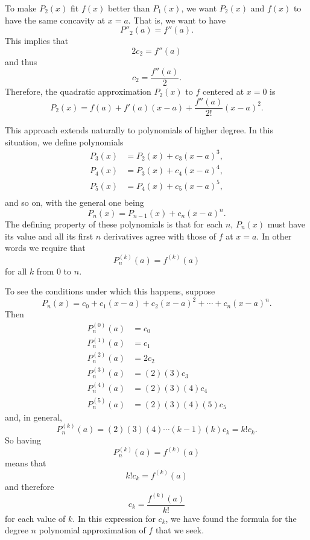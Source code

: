 To make $P_2(x)$ fit $f(x)$ better than $P_1(x)$, we want $P_2(x)$ and $f(x)$ to have the same concavity at $x=a$. That is, we want to have
\[P''_2(a) = f''(a).\]
This implies that
\[2c_2 = f''(a)\]
and thus
\[c_2 = \frac{f''(a)}{2}.\]
Therefore, the quadratic approximation $P_2(x)$ to $f$ centered at $x=0$ is
\[P_2(x) = f(a) + f'(a)(x-a) + \frac{f''(a)}{2!}(x-a)^2.\]

This approach extends naturally to polynomials of higher degree. In this situation, we define polynomials
\begin{align*}
P_3(x) &= P_2(x) + c_3(x-a)^3, \\
P_4(x) &= P_3(x) + c_4(x-a)^4, \\
P_5(x) &= P_4(x) + c_5(x-a)^5, \\
\end{align*}
and so on, with the general one being
\[P_n(x) = P_{n-1}(x) + c_n(x-a)^n.\]
The defining property of these polynomials is that for each $n$, $P_n(x)$ must have its value and all its first $n$ derivatives agree with those of $f$ at $x = a$. In other words we require that
\[P^{(k)}_n(a) = f^{(k)}(a)\]
for all $k$ from 0 to $n$.

To see the conditions under which this happens, suppose
\[P_n(x) = c_0 + c_1(x-a) + c_2(x-a)^2 + \cdots + c_n(x-a)^n.\]
Then
\begin{align*}
P^{(0)}_n(a) &= c_0 \\
P^{(1)}_n(a) &= c_1 \\
P^{(2)}_n(a) &= 2c_2 \\
P^{(3)}_n(a) &= (2)(3)c_3 \\
P^{(4)}_n(a) &= (2)(3)(4)c_4 \\
P^{(5)}_n(a) &= (2)(3)(4)(5)c_5
\end{align*}
and, in general,
\[P^{(k)}_n(a) = (2)(3)(4) \cdots (k-1)(k)c_k = k!c_k.\]
So having
\[P^{(k)}_n(a) = f^{(k)}(a)\]
means that
\[k!c_k = f^{(k)}(a)\]
and therefore
\[c_k = \frac{f^{(k)}(a)}{k!}\]
for each value of $k$. In this expression for $c_k$, we have found the formula for the degree $n$ polynomial approximation of $f$ that we seek.  

\vspace*{5pt}
\nin {}
\vspace*{1pt}

